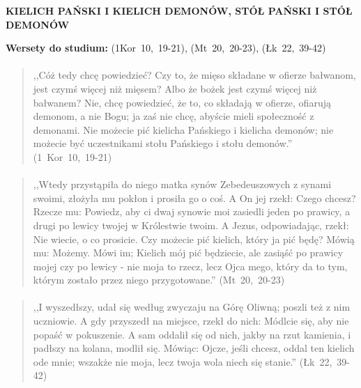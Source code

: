 \documentclass[10pt,a4paper,oneside]{article}
\begin{document}
\centerline{\textbf{\MakeUppercase{Kielich Pański i kielich demonów, stół Pański i stół demonów}}}
\begin{center}
\textbf{Wersety do studium:} 
\mbox{(1Kor 10, 19-21)}, \mbox{(Mt 20, 20-23)}, \mbox{(Łk 22, 39-42)}
\end{center}
\paragraph{}
\begin{quote}
,,Cóż tedy chcę powiedzieć? Czy to, że mięso składane w ofierze bałwanom, jest czymś więcej niż mięsem? Albo że bożek jest czymś więcej niż bałwanem? Nie, chcę powiedzieć, że to, co składają w ofierze, ofiarują demonom, a nie Bogu; ja zaś nie chcę, abyście mieli społeczność z demonami. Nie możecie pić kielicha Pańskiego i kielicha demonów; nie możecie być uczestnikami stołu Pańskiego i stołu demonów.'' \mbox{(1 Kor 10, 19-21)}
\end{quote}
\paragraph{}
\begin{quote}
,,Wtedy przystąpiła do niego matka synów Zebedeuszowych z synami swoimi, złożyła mu pokłon i prosiła go o coś. A On jej rzekł: Czego chcesz? Rzecze mu: Powiedz, aby ci dwaj synowie moi zasiedli jeden po prawicy, a drugi po lewicy twojej w Królestwie twoim. A Jezus, odpowiadając, rzekł: Nie wiecie, o co prosicie. Czy możecie pić kielich, który ja pić będę? Mówią mu: Możemy. Mówi im; Kielich mój pić będziecie, ale zasiąść po prawicy mojej czy po lewicy - nie moja to rzecz, lecz Ojca mego, który da to tym, którym zostało przez niego przygotowane.'' \mbox{(Mt 20, 20-23)}
\end{quote}
\paragraph{}
\begin{quote}
,,I wyszedłszy, udał się według zwyczaju na Górę Oliwną; poszli też z nim uczniowie. A gdy przyszedł na miejsce, rzekł do nich: Módlcie się, aby nie popaść w pokuszenie. A sam oddalił się od nich, jakby na rzut kamienia, i padłszy na kolana, modlił się. Mówiąc: Ojcze, jeśli chcesz, oddal ten kielich ode mnie; wszakże nie moja, lecz twoja wola niech się stanie.'' \mbox{(Łk 22, 39-42)}
\end{quote}
\end{document}
